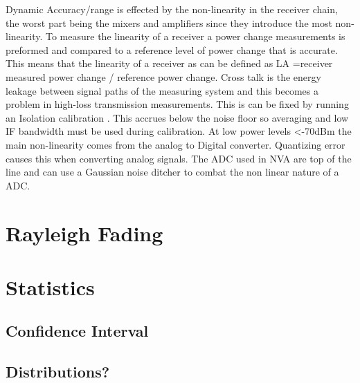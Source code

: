 Dynamic Accuracy/range is effected by the non-linearity in the receiver chain, the worst part being the mixers and amplifiers since they introduce the most non-linearity. To measure the linearity of a receiver a power change measurements is preformed and compared to a reference level of power change that is accurate. This means that the linearity of a receiver as can be defined as LA =receiver measured power change / reference power change.
Cross talk is the energy leakage between signal paths of the measuring system and this becomes a problem in high-loss transmission measurements. This is can be fixed by running an Isolation calibration \citep{crosstalk}. This accrues below the noise floor so averaging and low IF bandwidth must be used during calibration.
At low power levels <-70dBm the main non-linearity comes from the analog to Digital converter. Quantizing error causes this when converting analog signals. The ADC used in NVA are top of the line and can use a Gaussian noise ditcher to combat the non linear nature of a ADC. 



\section{Rayleigh Fading}
\section{Statistics}
\subsection{Confidence Interval}
\subsection{Distributions?}